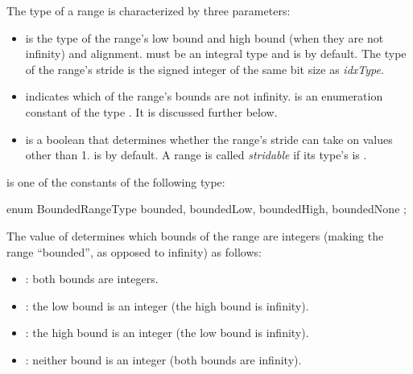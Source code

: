 The type of a range is characterized by three parameters:
\begin{itemize}

\item {} is the type of the range's low bound and high bound
  (when they are not infinity) and alignment.  must be an
  integral type and is  by default.
  The type of the range's stride is the signed integer
  of the same bit size as \emph{idxType}.

\item {} indicates which of the range's bounds are not infinity.
   is an enumeration constant of the type
  . It is discussed further below.

\item {} is a boolean that determines whether the range's stride
  can take on values other than 1.
   is  by default.
  A range is called \emph{stridable}
  if its type's  is .

\end{itemize}

 is one of the constants of the following type:

\begin{chapel}
enum BoundedRangeType { bounded, boundedLow, boundedHigh, boundedNone };
\end{chapel}

The value of  determines which bounds of the range
are integers (making the range ``bounded'', as opposed to infinity)
as follows:

\begin{itemize}

\item {}:
  both bounds are integers.

\item {}:
  the low bound is an integer (the high bound is infinity).

\item {}:
  the high bound is an integer (the low bound is infinity).

\item {}:
  neither bound is an integer (both bounds are infinity).

\end{itemize}

